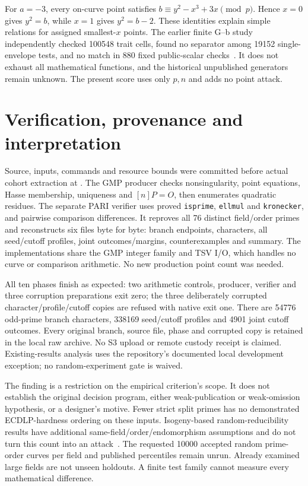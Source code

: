 \documentclass[10pt]{article}
\begin{document}
For $a=-3$, every on-curve point satisfies
$b\equiv y^2-x^3+3x\pmod p$. Hence $x=0$ gives $y^2=b$, while $x=1$
gives $y^2=b-2$. These identities explain simple relations for assigned
smallest-$x$ points. The earlier finite G--b study independently checked
100548 trait cells, found no separator among 19152 single-envelope tests,
and no match in 880 fixed public-scalar checks~\cite{gb}. It does not
exhaust all mathematical functions, and the historical unpublished generators
remain unknown. The present score uses only $p,n$ and adds no point attack.
\clearpage

\section{Verification, provenance and interpretation}
Source, inputs, commands and resource bounds were committed before actual
cohort extraction at .
The GMP producer checks nonsingularity, point equations, Hasse membership,
uniqueness and $[n]P=O$, then enumerates quadratic residues. The separate PARI
verifier uses proved \texttt{isprime}, \texttt{ellmul} and \texttt{kronecker},
and pairwise comparison differences. It reproves all 76 distinct field/order
primes and reconstructs six files byte for byte: branch endpoints, characters,
all seed/cutoff profiles, joint outcomes/margins, counterexamples and summary.
The implementations share the GMP integer family and TSV I/O, which handles
no curve or comparison arithmetic. No new production point count was needed.

All ten phases finish as expected: two arithmetic controls, producer, verifier
and three corruption preparations exit zero; the three deliberately corrupted
character/profile/cutoff copies are refused with native exit one. There are
54776 odd-prime branch characters, 338169 seed/cutoff profiles and 4901 joint
cutoff outcomes. Every original branch, source file, phase and corrupted copy
is retained in the local raw archive. No S3 upload or remote custody receipt
is claimed. Existing-results analysis uses the repository's documented local
development exception; no random-experiment gate is waived.

The finding is a restriction on the empirical criterion's scope. It does
not establish the original decision program, either weak-publication or
weak-omission hypothesis, or a designer's motive. Fewer strict split primes
has no demonstrated ECDLP-hardness ordering on these inputs. Isogeny-based
random-reducibility results have additional same-field/order/endomorphism
assumptions and do not turn this count into an attack~\cite{jmv}.
The requested 10000 accepted random prime-order curves per field and published
percentiles remain unrun. Already examined large fields are not unseen
holdouts. A finite test family cannot measure every mathematical difference.
\end{document}
